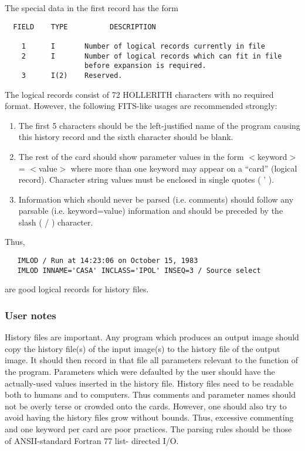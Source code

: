      The special data in the first record has the form

\begin{verbatim}
  FIELD    TYPE          DESCRIPTION

    1      I       Number of logical records currently in file
    2      I       Number of logical records which can fit in file
                   before expansion is required.
    3      I(2)    Reserved.
\end{verbatim}

The logical records consist of 72 HOLLERITH characters with no
required format.  However, the following FITS-like usages are
recommended strongly:
\begin{enumerate}
\item The first 5 characters should be the left-justified name of the
program causing this history record and the sixth character
should be blank.

\item The rest of the card should show parameter values in the form
             $<$keyword$>$  =  $<$value$>$
where more than one keyword may appear on a ``card'' (logical
record).  Character string values must be enclosed in single
quotes ( ' ).

\item Information which should never be parsed (i.e. comments) should
follow any parsable (i.e. keyword=value) information and should
be preceded by the slash ( / ) character.

\end{enumerate}
Thus,

\begin{verbatim}
   IMLOD / Run at 14:23:06 on October 15, 1983
   IMLOD INNAME='CASA' INCLASS='IPOL' INSEQ=3 / Source select
\end{verbatim}
are good logical records for history files.


\subsubsection{User notes}

     History files are important.  Any program which produces an output
image should copy the history file(s) of the input image(s) to the
history file of the output image.  It should then record in that file
all parameters relevant to the function of the program.  Parameters
which were defaulted by the user should have the actually-used values
inserted in the history file.  History files need to be readable both
to humans and to computers.  Thus comments and parameter names should
not be overly terse or crowded onto the cards.  However, one should
also try to avoid having the history files grow without bounds.  Thus,
excessive commenting and one keyword per card are poor practices.  The
parsing rules should be those of ANSII-standard Fortran 77 list-
directed I/O.


